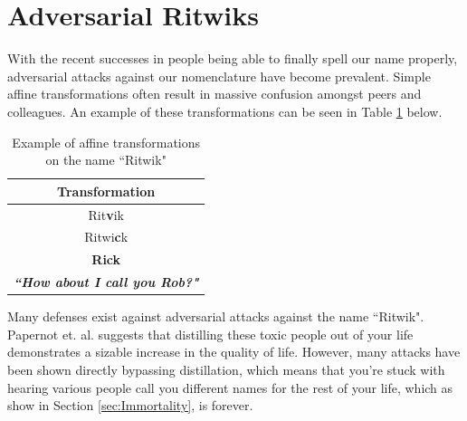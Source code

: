 \documentclass[]{article}
\begin{document}
\section{Adversarial Ritwiks}
With the recent successes in people being able to finally spell our name properly, adversarial attacks against our nomenclature have become prevalent. Simple affine transformations often result in massive confusion amongst peers and colleagues. An example of these transformations can be seen in Table \ref{table:affineadversarial} below.
\begin{table}[h]
\centering
\begin{tabular}{|c|}
	\hline 
	\textbf{Transformation}\\ 
	\hline 
	Rit\textbf{v}ik\\ 
	\hline 
	Ritwi\textbf{c}k\\
	\hline
	\textbf{Rick}\\
	\hline
	\textbf{\textit{``How about I call you Rob?"}}\\
	\hline
\end{tabular}
\caption{Example of affine transformations on the name ``Ritwik"}
\label{table:affineadversarial}
\end{table}
Many defenses exist against adversarial attacks against the name ``Ritwik". Papernot et. al. \cite{Papernot} suggests that distilling these toxic people out of your life demonstrates a sizable increase in the quality of life. However, many attacks have been shown directly bypassing distillation, which means that you're stuck with hearing various people call you different names for the rest of your life, which as show in Section \ref{sec:Immortality}, is forever.




\end{document}
